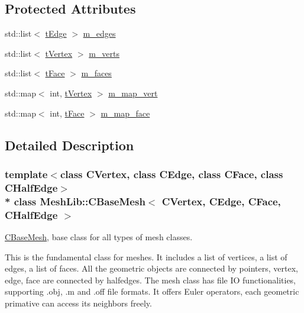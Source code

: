 \subsection*{Protected Attributes}
\begin{DoxyCompactItemize}
\item 
std\+::list$<$ \hyperlink{class_mesh_lib_1_1_c_base_mesh_a966f6321c2cf92b849e77b931a36821b}{t\+Edge} $>$ \hyperlink{class_mesh_lib_1_1_c_base_mesh_a5986476cf61a1ea5b5932f33302b6c10}{m\+\_\+edges}
\item 
std\+::list$<$ \hyperlink{class_mesh_lib_1_1_c_base_mesh_adcf412e8267910b50f3145d6416947da}{t\+Vertex} $>$ \hyperlink{class_mesh_lib_1_1_c_base_mesh_a5738a63ce99209aa5085982ecc9ba50a}{m\+\_\+verts}
\item 
std\+::list$<$ \hyperlink{class_mesh_lib_1_1_c_base_mesh_ad231546551e85dffb41c9aa9bcf5b86b}{t\+Face} $>$ \hyperlink{class_mesh_lib_1_1_c_base_mesh_a4699846e3f577e064c3b871183d8ba0a}{m\+\_\+faces}
\item 
std\+::map$<$ int, \hyperlink{class_mesh_lib_1_1_c_base_mesh_adcf412e8267910b50f3145d6416947da}{t\+Vertex} $>$ \hyperlink{class_mesh_lib_1_1_c_base_mesh_ad92d530f9eacd1eb2adef1770fd0ff80}{m\+\_\+map\+\_\+vert}
\item 
std\+::map$<$ int, \hyperlink{class_mesh_lib_1_1_c_base_mesh_ad231546551e85dffb41c9aa9bcf5b86b}{t\+Face} $>$ \hyperlink{class_mesh_lib_1_1_c_base_mesh_afdcd24f68c0ab83a6b172a64753b7482}{m\+\_\+map\+\_\+face}
\end{DoxyCompactItemize}


\subsection{Detailed Description}
\subsubsection*{template$<$class C\+Vertex, class C\+Edge, class C\+Face, class C\+Half\+Edge$>$\\*
class Mesh\+Lib\+::\+C\+Base\+Mesh$<$ C\+Vertex, C\+Edge, C\+Face, C\+Half\+Edge $>$}

\hyperlink{class_mesh_lib_1_1_c_base_mesh}{C\+Base\+Mesh}, base class for all types of mesh classes. 

This is the fundamental class for meshes. It includes a list of vertices, a list of edges, a list of faces. All the geometric objects are connected by pointers, vertex, edge, face are connected by halfedges. The mesh class has file IO functionalities, supporting .obj, .m and .off file formats. It offers Euler operators, each geometric primative can access its neighbors freely.


